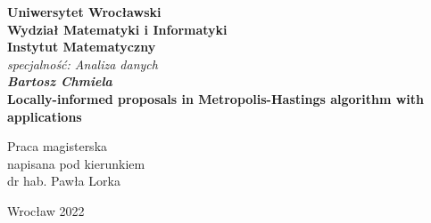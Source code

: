 \documentclass[a4paper, 12pt]{article}
\numberwithin{equation}{subsection}
\begin{document}
	\thispagestyle{empty}
	\begin{center}
		\textbf{\large Uniwersytet Wroc\l{}awski\\
			Wydzia\l{} Matematyki i Informatyki\\
			Instytut Matematyczny}\\
		\textit{\large specjalno\'{s}\'{c}: Analiza danych}\\
		\vspace{4cm}
		\textbf{\textit{\large Bartosz Chmiela}\\
			\vspace{0.5cm}
			{\Large Locally-informed proposals in Metropolis-Hastings algorithm with applications}}\\
	\end{center}
	\vspace{3cm}
	{\large \hspace*{6.5cm}Praca magisterska\\
		\hspace*{6.5cm}napisana pod kierunkiem\\
		\hspace*{6.5cm}dr hab. Paw\l{}a Lorka }\\
	\vfill
	\begin{center}
		{\large Wroc\l{}aw 2022}\\
	\end{center}
	
\end{document}
